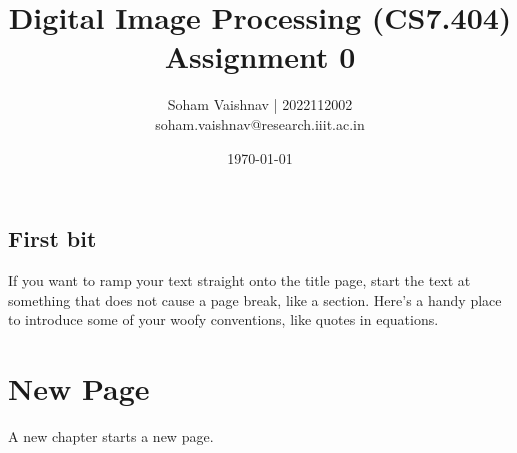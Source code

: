 \documentclass[notitlepage]{report}
\title{Digital Image Processing (CS7.404)\\
Assignment 0}
\author{Soham Vaishnav | 2022112002\\
soham.vaishnav@research.iiit.ac.in}
\date{\today}
\begin{document}
\maketitle

\begin{abstract}
\end{abstract}

\section*{First bit}
If you want to ramp your text straight onto the title page, start the text at 
something that does not cause a page break, like a section.  Here's a handy 
place to introduce some of your woofy conventions, like quotes in equations.
\chapter{New Page}
A new chapter starts a new page.  
\end{document}
